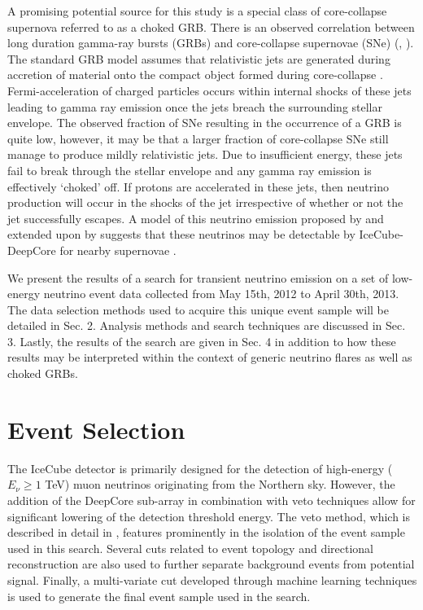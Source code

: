 \documentclass[manuscript]{aastex}
\begin{document}
A promising potential source for this study is a special class of core-collapse supernova referred to as a choked GRB. There is an observed correlation between long duration gamma-ray bursts (GRBs) and core-collapse supernovae (SNe) (\citep{2006ARA&A..44..507W}, \citep{2011AN....332..434M}).  The standard GRB model assumes that relativistic jets are generated during accretion of material onto the compact object formed during core-collapse \citep{1992MNRAS.258P..41R}. Fermi-acceleration of charged particles occurs within internal shocks of these jets leading to gamma ray emission once the jets breach the surrounding stellar envelope.  The observed fraction of SNe resulting in the occurrence of a GRB is quite low, however, it may be that a larger fraction of core-collapse SNe still manage to produce mildly relativistic jets.  Due to insufficient energy, these jets fail to break through the stellar envelope and any gamma ray emission is effectively `choked' off. If protons are accelerated in these jets, then neutrino production will occur in the shocks of the jet irrespective of whether or not the jet successfully escapes. A model of this neutrino emission proposed by \cite{2004PhRvL..93r1101R} and extended upon by \cite{2005PhRvL..95f1103A} suggests that these neutrinos may be detectable by IceCube-DeepCore for nearby supernovae \citep{PhysRevD.81.083011}.

We present the results of a search for transient neutrino emission on a set of low-energy neutrino event data collected from May 15th, 2012 to April 30th, 2013. The data selection methods used to acquire this unique event sample will be detailed in Sec. 2. Analysis methods and search techniques are discussed in Sec. 3. Lastly, the results of the search are given in Sec. 4 in addition to how these results may be interpreted within the context of generic neutrino flares as well as choked GRBs.
\section{Event Selection}
The IceCube detector is primarily designed for the detection of high-energy ($E_{\nu} \geq 1$ TeV) muon neutrinos originating from the Northern sky. However, the addition of the DeepCore sub-array in combination with veto techniques allow for significant lowering of the detection threshold energy. The veto method, which is described in detail in \cite{2012APh....35..615A}, features prominently in the isolation of the event sample used in this search. Several cuts related to event topology and directional reconstruction are also used to further separate background events from potential signal. Finally, a multi-variate cut developed through machine learning techniques is used to generate the final event sample used in the search.
\end{document}
